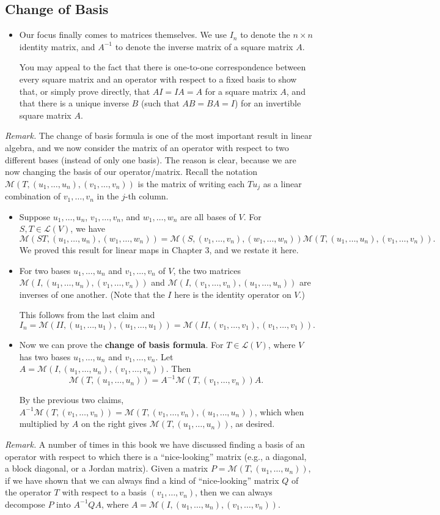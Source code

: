 \documentclass{article}
\newcommand{\LV}{\mathcal{L}(V)}
\newcommand{\M}{\mathcal{M}}
\begin{document}
\subsection{Change of Basis}
\begin{itemize}
    \item Our focus finally comes to matrices themselves. We use $I_n$ to denote the $n \times n$ identity matrix, and $A^{-1}$ to denote the inverse matrix of a square matrix $A$.

    You may appeal to the fact that there is one-to-one correspondence between every square matrix and an operator with respect to a fixed basis to show that, or simply prove directly, that $AI = IA = A$ for a square matrix $A$, and that there is a unique inverse $B$ (such that $AB = BA = I$) for an invertible square matrix $A$.
\end{itemize}
\textit{Remark.} The change of basis formula is one of the most important result in linear algebra, and we now consider the matrix of an operator with respect to two different bases (instead of only one basis). The reason is clear, because we are now changing the basis of our operator/matrix. Recall the notation $\M(T,(u_1,\dots,u_n),(v_1,\dots,v_n))$ is the matrix of writing each $Tu_j$ as a linear combination of $v_1,\dots,v_n$ in the $j$-th column.
\begin{itemize}
    \item Suppose $u_1,\dots,u_n$, $v_1,\dots,v_n$, and $w_1,\dots,w_n$ are all bases of $V$. For $S,T \in \LV$, we have
    \[\M(ST,(u_1,\dots,u_n),(w_1,\dots,w_n)) = \M(S,(v_1,\dots,v_n),(w_1,\dots,w_n))\M(T,(u_1,\dots,u_n),(v_1,\dots,v_n)).\] We proved this result for linear maps in Chapter 3, and we restate it here.
    \item For two bases $u_1,\dots,u_n$ and $v_1,\dots,v_n$ of $V$, the two matrices $\M(I,(u_1,\dots,u_n),(v_1,\dots,v_n))$ and $\M(I,(v_1,\dots,v_n),(u_1,\dots,u_n))$ are inverses of one another. (Note that the $I$ here is the identity operator on $V$.)

    This follows from the last claim and \[I_n = \M(II,(u_1,\dots,u_1),(u_1,\dots,u_1)) = \M (II,(v_1,\dots,v_1),(v_1,\dots,v_1)).\]
    \item Now we can prove the \textbf{change of basis formula}. For $T \in \LV$, where $V$ has two bases $u_1,\dots,u_n$ and $v_1,\dots,v_n$. Let $A = \M(I,(u_1,\dots,u_n),(v_1,\dots,v_n))$. Then \[\M(T,(u_1,\dots,u_n)) = A^{-1}\M(T,(v_1,\dots,v_n))A.\]

    By the previous two claims, $A^{-1}\M(T,(v_1,\dots,v_n)) = \M(T,(v_1,\dots,v_n),(u_1,\dots,u_n))$, which when multiplied by $A$ on the right gives $\M(T,(u_1,\dots,u_n))$, as desired.
    \end{itemize}
    \textit{Remark.} A number of times in this book we have discussed finding a basis of an operator with respect to which there is a ``nice-looking'' matrix (e.g., a diagonal, a block diagonal, or a Jordan matrix). Given a matrix $P = \M(T,(u_1,\dots,u_n))$, if we have shown that we can always find a kind of ``nice-looking'' matrix $Q$ of the operator $T$ with respect to a basis $(v_1,\dots,v_n)$, then we can always decompose $P$ into $A^{-1}QA$, where $A = \M(I,(u_1,\dots,u_n),(v_1,\dots,v_n))$.
\end{document}
